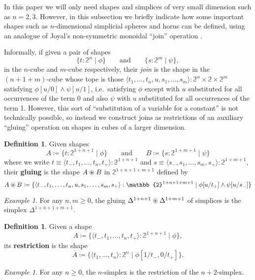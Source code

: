 \documentclass[12pt]{amsart}
\theoremstyle{plain}
\theoremstyle{definition}
\newtheorem{defn}[thm]{Definition}
\theoremstyle{remark}
\newtheorem{ex}[thm]{Example}
\numberwithin{equation}{section}
\newcommand{\jdeq}{\equiv}
\newcommand{\defeq}{\coloneqq}
\newcommand{\sh}[2]{\{#1\mid #2\}}
\newcommand{\restr}[1]{\overline{#1}}
\newcommand{\pair}[1]{\langle #1\rangle}
\newcommand{\two}{\mathbb{2}}
\begin{document}
In this paper we will only need shapes and simplices of very small dimension such as $n=2,3$.
However, in this subsection we briefly indicate how some important shapes such as $n$-dimensional simplicial spheres and horns can be defined, using an analogue of Joyal's non-symmetric monoidal ``join'' operation \cite{joyal-quasi}.

Informally, if given a pair of shapes
\[  \sh{t:\two^n}{\phi} \qquad\text{and}\qquad  \sh{s:\two^m}{\psi}, \]
in the $n$-cube and $m$-cube respectively, their \emph{join} is the shape in the $(n+1+m)$-cube whose tope is those $\pair{t_1,\dots,t_n,u, s_1,\ldots, s_m}:\two^n \times \two \times \two^m$ satisfying $\phi[u/0] \wedge \psi[u/1]$, i.e.~satisfying $\phi$ except with $u$ substituted for all occurrences of the term $0$ and also $\psi$ with $u$ substituted for all occurrences of the term 1.  However, this sort of ``substitution of a variable for a constant'' is not technically possible, so instead we construct joins as restrictions of an auxiliary ``gluing'' operation on shapes in cubes of a larger dimension.

\begin{defn}
Given shapes 
\begin{equation}
  A \defeq \sh{t:\two^{1+n+1}}{\phi} \qquad\text{and}\qquad  B \defeq\sh{s:\two^{1+m+1}}{\psi} \label{eq:gluing-data}
\end{equation}
where we write $t \jdeq \pair{t_-,t_1,\ldots, t_n,t_+} : \two^{1+n+1}$ and $s \jdeq \pair{s_-,s_1,\ldots, s_m,s_+} : \two^{1+m+1}$,
their \textbf{gluing} is the shape $A \oast B$ in $\two^{1+n+1+m+1}$ defined by
\[ A \oast B \defeq \sh{\pair{t_-, t_1, \ldots, t_{n}, u, s_1,\ldots, s_{m}, s_+} : \two^{1+n+1+m+1}}{\phi[u/t_{+}] \land \psi[u/s_-]} \]
\end{defn}

\begin{ex}
  For any $n,m\geq 0$, the gluing $\Delta^{1+n+1} \oast \Delta^{1+m+1}$ of simplices is the simplex $\Delta^{1+n+1+m+1}$.
\end{ex}

\begin{defn}
Given a shape 
\[  A \defeq \sh{\pair{t_-,t_1,\ldots,t_n,t_+}:\two^{1+n+1}}{\phi}, \]
its \textbf{restriction} is the shape
\[ \restr{A} \defeq \sh{\pair{t_1,\ldots,t_n}:\two^{n}}{\phi[1/t_-,0/t_+]}.
\]
\end{defn}

\begin{ex} For any $n \geq 0$, the $n$-simplex is the restriction of the $n+2$-simplex. 
\end{ex}
\end{document}
